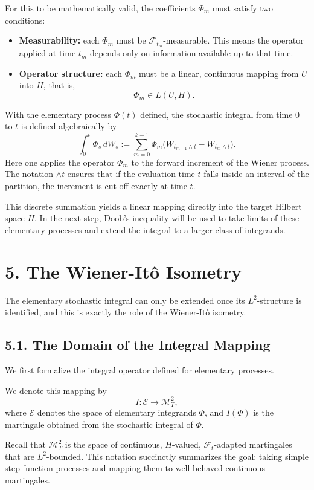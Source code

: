 \documentclass[11pt]{article}
\theoremstyle{definition}
\theoremstyle{remark}
\begin{document}
For this to be mathematically valid, the coefficients \(\Phi_m\) must satisfy two conditions:
\begin{itemize}
\item \textbf{Measurability:} each \(\Phi_m\) must be \(\mathcal F_{t_m}\)-measurable. This means the operator applied at time \(t_m\) depends only on information available up to that time.
\item \textbf{Operator structure:} each \(\Phi_m\) must be a linear, continuous mapping from \(U\) into \(H\), that is,
\[
\Phi_m\in L(U,H).
\]
\end{itemize}

With the elementary process \(\Phi(t)\) defined, the stochastic integral from time \(0\) to \(t\) is defined algebraically by
\[
\int_0^t \Phi_s\,dW_s
:=
\sum_{m=0}^{k-1}\Phi_m\bigl(W_{t_{m+1}\wedge t}-W_{t_m\wedge t}\bigr).
\]
Here one applies the operator \(\Phi_m\) to the forward increment of the Wiener process. The notation \(\wedge t\) ensures that if the evaluation time \(t\) falls inside an interval of the partition, the increment is cut off exactly at time \(t\).

This discrete summation yields a linear mapping directly into the target Hilbert space \(H\). In the next step, Doob's inequality will be used to take limits of these elementary processes and extend the integral to a larger class of integrands.

\section*{5. The Wiener-It\^o Isometry}
The elementary stochastic integral can only be extended once its \(L^2\)-structure is identified, and this is exactly the role of the Wiener-It\^o isometry.

\subsection*{5.1. The Domain of the Integral Mapping}
We first formalize the integral operator defined for elementary processes.

We denote this mapping by
\[
I:\mathcal E\to \mathcal M_T^2,
\]
where \(\mathcal E\) denotes the space of elementary integrands \(\Phi\), and \(I(\Phi)\) is the martingale obtained from the stochastic integral of \(\Phi\).

Recall that \(\mathcal M_T^2\) is the space of continuous, \(H\)-valued, \(\mathcal F_t\)-adapted martingales that are \(L^2\)-bounded. This notation succinctly summarizes the goal: taking simple step-function processes and mapping them to well-behaved continuous martingales.
\end{document}

